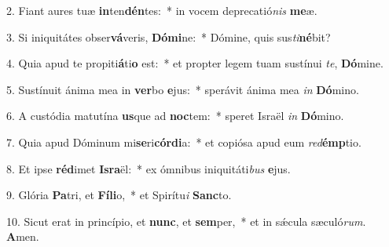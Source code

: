 2. Fiant aures tuæ \textbf{in}ten\textbf{dén}tes:~*  in vocem deprecatió\textit{nis} \textbf{me}æ.\

3. Si iniquitátes obser\textbf{vá}veris, \textbf{Dó}\textbf{mi}ne:~*  Dómine, quis sus\textit{ti}\textbf{né}bit?\

4. Quia apud te propiti\textbf{á}ti\textbf{o} est:~*  et propter legem tuam sustínui \textit{te}, \textbf{Dó}mine.\

5. Sustínuit ánima mea in \textbf{ver}bo \textbf{e}jus:~*  sperávit ánima mea \textit{in} \textbf{Dó}mino.\

6. A custódia matutína \textbf{us}que ad \textbf{noc}tem:~*  speret Israël \textit{in} \textbf{Dó}mino.\

7. Quia apud Dóminum mi\textbf{se}ri\textbf{cór}\textbf{di}a:~*  et copiósa apud eum \textit{red}\textbf{émp}tio.\

8. Et ipse \textbf{réd}imet \textbf{Is}\textbf{ra}ël:~*  ex ómnibus iniquitáti\textit{bus} \textbf{e}jus.\

9. Glória \textbf{Pa}tri, et \textbf{Fí}\textbf{li}o,~*  et Spirítu\textit{i} \textbf{Sanc}to.\

10. Sicut erat in princípio, et \textbf{nunc}, et \textbf{sem}per,~*  et in sǽcula sæculó\textit{rum}. \textbf{A}men.\

